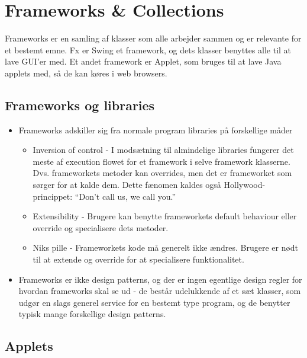 \section{Frameworks \& Collections}

Frameworks er en samling af klasser som alle arbejder sammen og er relevante for et bestemt emne. Fx er Swing et framework, og dets klasser benyttes alle til at lave GUI’er med. Et andet framework er Applet, som bruges til at lave Java applets med, så de kan køres i web browsers.


\subsection{Frameworks og libraries}

\begin{itemize}
  \item Frameworks adskiller sig fra normale program libraries på forskellige måder
  \begin{itemize}
    \item Inversion of control - I modsætning til almindelige libraries fungerer det meste af execution flowet for et framework i selve framework klasserne. Dvs. frameworkets metoder kan overrides, men det er frameworket som sørger for at kalde dem. Dette fænomen kaldes også Hollywood-princippet: “Don’t call us, we call you.”
    \item Extensibility - Brugere kan benytte frameworkets default behaviour eller override og specialisere dets metoder.
    \item Niks pille - Frameworkets kode må generelt ikke ændres. Brugere er nødt til at extende og override for at specialisere funktionalitet.
  \end{itemize}

  \item Frameworks er ikke design patterns, og der er ingen egentlige design regler for hvordan frameworks skal se ud - de består udelukkende af et sæt klasser, som udgør en slags generel service for en bestemt type program, og de benytter typisk mange forskellige design patterns.
\end{itemize}

\subsection{Applets}

